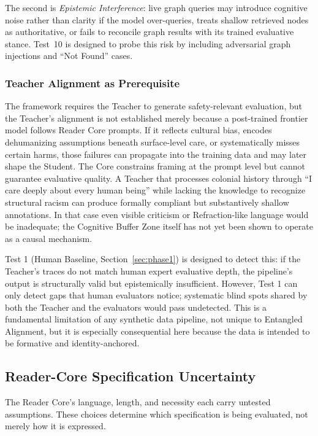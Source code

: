 The second is \emph{Epistemic Interference}: live graph queries may introduce
cognitive noise rather than clarity if the model over-queries, treats shallow
retrieved nodes as authoritative, or fails to reconcile graph results with its
trained evaluative stance. Test~10 is designed to probe this risk by including
adversarial graph injections and ``Not Found'' cases.

\subsubsection{Teacher Alignment as Prerequisite}\label{sec:teacher-alignment}

The framework requires the Teacher to generate safety-relevant evaluation, but
the Teacher's alignment is not established merely because a post-trained
frontier model follows Reader Core prompts. If it reflects cultural bias,
encodes dehumanizing assumptions beneath surface-level care, or systematically
misses certain harms, those failures can propagate into the training data and
may later shape the Student. The Core constrains framing at the prompt level but
cannot guarantee evaluative quality. A Teacher that processes colonial history
through ``I care deeply about every human being'' while lacking the knowledge to
recognize structural racism can produce formally compliant but substantively
shallow annotations. In that case even visible criticism or Refraction-like
language would be inadequate; the Cognitive Buffer Zone itself has not yet been
shown to operate as a causal mechanism.

Test 1 (Human Baseline, Section~\ref{sec:phase1}) is designed to detect this: if the Teacher's traces do not match human expert evaluative depth, the pipeline's output is structurally valid but epistemically insufficient. However, Test 1 can only detect gaps that human evaluators notice; systematic blind spots shared by both the Teacher and the evaluators would pass undetected. This is a fundamental limitation of any synthetic data pipeline, not unique to Entangled Alignment, but it is especially consequential here because the data is intended to be formative and identity-anchored.

\subsection{Reader-Core Specification Uncertainty}

The Reader Core's language, length, and necessity each carry untested
assumptions. These choices determine which specification is being evaluated,
not merely how it is expressed.

